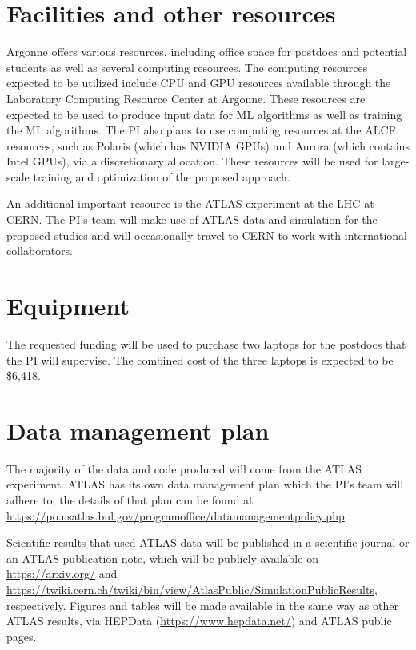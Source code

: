 \documentclass[letter, USenglish, 11pt, subfigure]{article}
\begin{document}
\section{Facilities and  other resources}
Argonne offers various resources, including office space for postdocs and potential students as well as several computing resources. The computing resources expected to be utilized include CPU and GPU resources available through the Laboratory Computing Resource Center at Argonne. These resources are expected to be used to produce input data for ML algorithms as well as training the ML algorithms. The PI also plans to use computing resources at the ALCF resources, such as Polaris (which has NVIDIA GPUs) and Aurora (which contains Intel GPUs), via a discretionary allocation. These resources will be used for large-scale training and optimization of the proposed approach.

An additional important resource is the ATLAS experiment at the LHC at CERN. The PI's team will make use of ATLAS data and simulation for the proposed studies and will occasionally travel to CERN to work with international collaborators.

\clearpage

\section{Equipment}
The requested funding will be used to purchase two laptops for the postdocs that the PI will supervise. The combined cost of the three laptops is expected to be \$6,418.

\clearpage

\section{Data management plan}
The majority of the data and code produced will come from the ATLAS experiment. ATLAS has its own data management plan which the PI's team will adhere to; the details of that plan can be found at \url{https://po.usatlas.bnl.gov/programoffice/datamanagementpolicy.php}.

Scientific results that used ATLAS data will be published in a scientific journal or an ATLAS publication note, which will be publicly available on \url{https://arxiv.org/} and \url{https://twiki.cern.ch/twiki/bin/view/AtlasPublic/SimulationPublicResults}, respectively. Figures and tables will be made available in the same way as other ATLAS results, via HEPData (\url{https://www.hepdata.net/}) and ATLAS public pages. 
\end{document}
